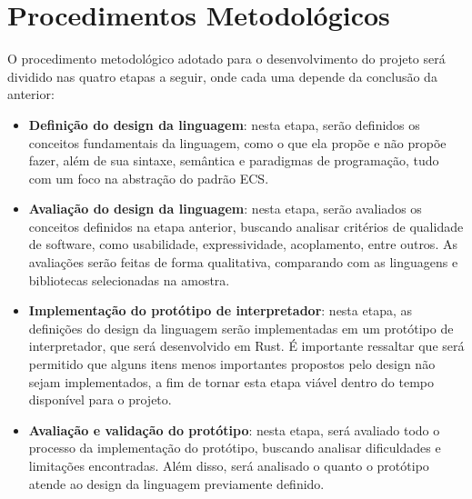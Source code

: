\section{Procedimentos Metodológicos}

O procedimento metodológico adotado para o desenvolvimento do projeto será dividido nas quatro etapas a seguir, onde cada uma depende da conclusão da anterior:

\begin{itemize}
    \item \textbf{Definição do design da linguagem}: nesta etapa, serão definidos os conceitos fundamentais da linguagem, como o que ela propõe e não propõe fazer, além de sua sintaxe, semântica e paradigmas de programação, tudo com um foco na abstração do padrão ECS.
    \item \textbf{Avaliação do design da linguagem}: nesta etapa, serão avaliados os conceitos definidos na etapa anterior, buscando analisar critérios de qualidade de software, como usabilidade, expressividade, acoplamento, entre outros. As avaliações serão feitas de forma qualitativa, comparando com as linguagens e bibliotecas selecionadas na amostra.
    \item \textbf{Implementação do protótipo de interpretador}: nesta etapa, as definições do design da linguagem serão implementadas em um protótipo de interpretador, que será desenvolvido em Rust. É importante ressaltar que será permitido que alguns itens menos importantes propostos pelo design não sejam implementados, a fim de tornar esta etapa viável dentro do tempo disponível para o projeto.
    \item \textbf{Avaliação e validação do protótipo}: nesta etapa, será avaliado todo o processo da implementação do protótipo, buscando analisar dificuldades e limitações encontradas. Além disso, será analisado o quanto o protótipo atende ao design da linguagem previamente definido.
\end{itemize}
